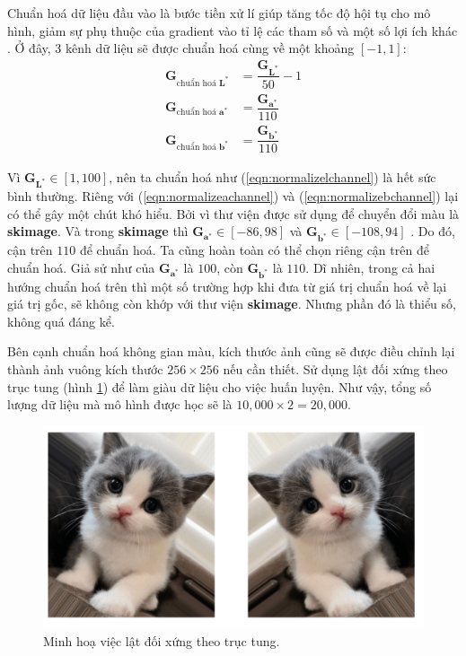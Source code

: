 \documentclass[a4paper, 12pt]{report}
\begin{document}
Chuẩn hoá dữ liệu đầu vào là bước tiền xử lí giúp tăng tốc độ hội tụ cho mô hình, giảm sự phụ thuộc của gradient vào tỉ lệ các tham số và một số lợi ích khác \cite{jasonscaledata2019, benscaledata2012}.
Ở đây, 3 kênh dữ liệu sẽ được chuẩn hoá cùng về một khoảng $[-1, 1]$:
\begin{align}
    \bm{G}_{\text{chuẩn hoá } \mathbf{L}^*} &= \dfrac{\bm{G}_{\mathbf{L}^*}}{50} - 1 \label{eqn:normalizelchannel}\\
    \bm{G}_{\text{chuẩn hoá } \mathbf{a}^*} &= \dfrac{\bm{G}_{\mathbf{a}^*}}{110} \label{eqn:normalizeachannel}\\
    \bm{G}_{\text{chuẩn hoá } \mathbf{b}^*} &= \dfrac{\bm{G}_{\mathbf{b}^*}}{110} \label{eqn:normalizebchannel}
\end{align}

Vì $\bm{G}_{\mathbf{L}^*} \in [1, 100]$, nên ta chuẩn hoá như (\ref{eqn:normalizelchannel}) là hết sức bình thường.
Riêng với (\ref{eqn:normalizeachannel}) và (\ref{eqn:normalizebchannel}) lại có thể gây một chút khó hiểu.
Bởi vì thư viện được sử dụng để chuyển đổi màu là \textbf{skimage}.
Và trong \textbf{skimage} thì $\bm{G}_{\mathbf{a}^*} \in [-86, 98]$ và  $\bm{G}_{\mathbf{b}^*} \in [-108, 94]$ \cite{replyrangelabinskimage2020}.
Do đó, cận trên $110$ để chuẩn hoá.
Ta cũng hoàn toàn có thể chọn riêng cận trên để chuẩn hoá.
Giả sử như của $\bm{G}_{\mathbf{a}^*}$ là $100$, còn $\bm{G}_{\mathbf{b}^*}$ là $110$.
Dĩ nhiên, trong cả hai hướng chuẩn hoá trên thì một số trường hợp khi đưa từ giá trị chuẩn hoá về lại giá trị gốc, sẽ không còn khớp với thư viện \textbf{skimage}.
Nhưng phần đó là thiểu số, không quá đáng kể.\vspace{5pt}

Bên cạnh chuẩn hoá không gian màu, kích thước ảnh cũng sẽ được điều chỉnh lại thành ảnh vuông kích thước $256\times 256$ nếu cần thiết.
Sử dụng lật đối xứng theo trục tung (hình \ref{fig:horizontalflip}) để làm giàu dữ liệu cho việc huấn luyện.
Như vậy, tổng số lượng dữ liệu mà mô hình được học sẽ là $10,000 \times 2 = 20,000$.

\begin{figure}[!h]
\captionsetup{width=0.8\textwidth}
\centering
\includegraphics[width=15cm]{images/horizontalflip.png}
\caption{Minh hoạ việc lật đối xứng theo trục tung.}
\label{fig:horizontalflip}
\end{figure}
\end{document}

